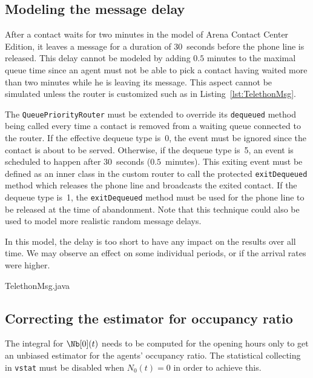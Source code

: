 

\subsection{Modeling the message delay}

After a contact waits for
two minutes in the model of Arena Contact Center Edition, it leaves a
message for a duration of 30~seconds before the phone line is released.
This delay cannot be modeled by
adding $0.5$ minutes
to the maximal queue time since an agent must not be able to pick a
contact having waited more than two minutes while he is leaving its
message.
This aspect cannot be simulated unless the
router is customized such as in Listing~\ref{lst:TelethonMsg}.

The
\texttt{Queue\-Priority\-Router} must be extended
to override its \texttt{dequeued} method being called
every time a contact is removed from a waiting queue connected to the
router.  If the effective dequeue type is~0,
the event must be ignored since the contact is about to be served.
Otherwise, if the dequeue type is~5,
an event is scheduled to happen
after 30~seconds ($0.5$~minutes).  This exiting event must be defined
as an inner class in the custom router to call the protected
\texttt{exit\-Dequeued} method which releases the phone line and
broadcasts the exited contact.
If the dequeue type is~1, the \texttt{exit\-Dequeued} method must be
used for the phone line to be released at the time of abandonment.
Note that this technique could also be used to model more realistic
random message delays.

In this model, the delay is too short to have
any impact on the results over all time.  We may observe an effect on
some individual periods, or if the arrival rates were higher.


{TelethonMsg.java}

\subsection{Correcting the estimator for occupancy ratio}
\label{sec:occcor}

The
integral for $\Nb[0](t)$ needs to be computed for the opening hours
only to get an unbiased estimator for the agents' occupancy ratio.
The statistical collecting in \texttt{vstat}
must be disabled when $N_0(t)=0$ in order to achieve this.

